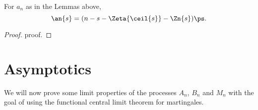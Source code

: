 \begin{lemma} \label{L: formula an}
	For $a_n$ as in the Lemmas above,
	\begin{equation}
		\an{s} = (n - s - \Zeta{\ceil{s}} - \Zn{s}) \ps .
	\end{equation}
\end{lemma}
\begin{proof} \label{P: formula an}
	proof.
\end{proof}

\section{Asymptotics}

We will now prove some limit properties of the processes $A_n$, $B_n$ and $M_n$ with the goal of using the functional central limit theorem for martingales.

